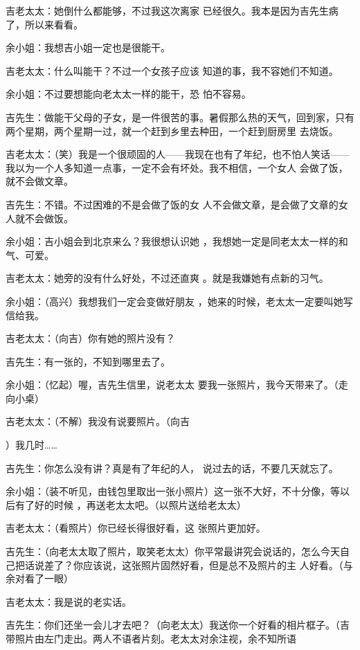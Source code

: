 \documentclass{article}
\begin{document}
\newpage

吉老太太：她倒什么都能够，不过我这次离家
已经很久。我本是因为吉先生病了，所以来看看。 


余小姐：我想吉小姐一定也是很能干。 

吉老太太：什么叫能干？不过一个女孩子应该
知道的事，我不容她们不知道。 

余小姐：不过要想能向老太太一样的能干，恐
怕不容易。 

吉先生：做能干父母的子女，是一件很苦的事。暑假那么热的天气，回到家，只有两个星期，两个星期一过，就一个赶到乡里去种田，一个赶到厨房里
去烧饭。 

吉老太太：（笑）我是一个很顽固的人——我现在也有了年纪，也不怕人笑话——我以为一个人多知道一点事，一定不会有坏处。我不相信，一个女人
会做了饭，就不会做文章。 

\newpage

吉先生：不错。不过困难的不是会做了饭的女
人不会做文章，是会做了文章的女人就不会做饭。 

余小姐：吉小姐会到北京来么？我很想认识她
，我想她一定是同老太太一样的和气、可爱。 

吉老太太：她旁的没有什么好处，不过还直爽
。就是我嫌她有点新的习气。 

余小姐：（高兴）我想我们一定会变做好朋友
，她来的时候，老太太一定要叫她写信给我。 


吉老太太：（向吉）你有她的照片没有？ 


吉先生：有一张的，不知到哪里去了。 

余小姐：（忆起）喔，吉先生信里，说老太太
要我一张照片，我今天带来了。（走向小桌） 

吉老太太：（不解）我没有说要照片。（向吉

\newpage
）我几时…… 

吉先生：你怎么没有讲？真是有了年纪的人，
说过去的话，不要几天就忘了。 

余小姐：（装不听见，由钱包里取出一张小照片）这一张不大好，不十分像，等以后有了好的时候
，再送老太太吧。（以照片送给老太太） 

吉老太太：（看照片）你已经长得很好看，这
张照片更加好。 

吉先生：（向老太太取了照片，取笑老太太）你平常最讲究会说话的，怎么今天自己把话说差了？你应该说，这张照片固然好看，但是总不及照片的主
人好看。（与余对看了一眼） 


吉老太太：我是说的老实话。 

吉先生：你们还坐一会儿才去吧？（向老太太）我送你一个好看的相片框子。（吉带照片由左门走出。两人不语者片刻。老太太对余注视，余不知所语
\newpage
\end{document}

